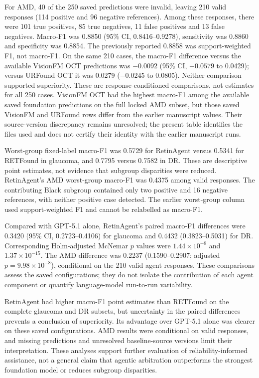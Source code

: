 For AMD, 40 of the 250 saved predictions were invalid, leaving 210 valid
responses (114 positive and 96 negative references). Among these responses,
there were 101 true positives, 85 true negatives, 11 false positives and
13 false negatives. Macro-F1 was 0.8850 (95\% CI, 0.8416--0.9278),
sensitivity was 0.8860 and specificity was 0.8854. The previously reported
0.8858 was support-weighted F1, not macro-F1. On the same 210 cases,
the macro-F1 difference versus the available VisionFM OCT predictions was
$-0.0092$ (95\% CI, $-0.0579$ to 0.0429); versus URFound OCT it was
0.0279 ($-0.0245$ to 0.0805). Neither comparison supported superiority.
These are response-conditioned comparisons, not estimates for all 250 cases.
VisionFM OCT had the highest macro-F1 among the available saved foundation
predictions on the full locked AMD subset, but those saved VisionFM and
URFound rows differ from the earlier manuscript values. Their source-version
discrepancy remains unresolved; the present table identifies the files used
and does not certify their identity with the earlier manuscript runs.

Worst-group fixed-label macro-F1 was 0.5729 for RetinAgent versus 0.5341
for RETFound in glaucoma, and 0.7795 versus 0.7582 in DR. These are descriptive
point estimates, not evidence that subgroup disparities were reduced.
RetinAgent's AMD worst-group macro-F1 was 0.4375 among valid responses.
The contributing Black subgroup contained only two positive and 16 negative
references, with neither positive case detected. The earlier worst-group
column used support-weighted F1 and cannot be relabelled as macro-F1.

Compared with GPT-5.1 alone, RetinAgent's paired macro-F1 differences were
0.3420 (95\% CI, 0.2723--0.4106) for glaucoma and 0.4432
(0.3823--0.5031) for DR. Corresponding Holm-adjusted McNemar $p$ values
were $1.44\times10^{-8}$ and $1.37\times10^{-15}$. The AMD difference
was 0.2237 (0.1590--0.2907; adjusted $p=9.98\times10^{-8}$), conditional
on the 210 valid agent responses. These comparisons assess the saved
configurations; they do not isolate the contribution of each agent component
or quantify language-model run-to-run variability.


RetinAgent had higher macro-F1 point estimates than RETFound on the complete
glaucoma and DR subsets, but uncertainty in the paired differences prevents
a conclusion of superiority. Its advantage over GPT-5.1 alone was clearer
on these saved configurations. AMD results were conditional on valid
responses, and missing predictions and unresolved baseline-source versions
limit their interpretation. These analyses support further evaluation of
reliability-informed assistance, not a general claim that agentic arbitration
outperforms the strongest foundation model or reduces subgroup disparities.


